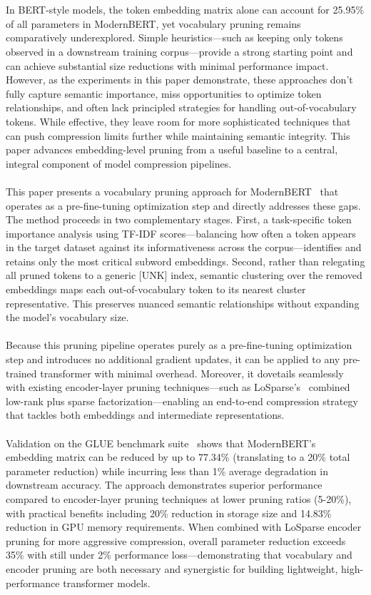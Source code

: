 \documentclass[twocolumn]{article}
\begin{document}
\\ \\
In BERT-style models, the token embedding matrix alone can account for 25.95\% of all parameters in ModernBERT, yet vocabulary pruning remains comparatively underexplored. Simple heuristics—such as keeping only tokens observed in a downstream training corpus—provide a strong starting point and can achieve substantial size reductions with minimal performance impact. However, as the experiments in this paper demonstrate, these approaches don't fully capture semantic importance, miss opportunities to optimize token relationships, and often lack principled strategies for handling out-of-vocabulary tokens. While effective, they leave room for more sophisticated techniques that can push compression limits further while maintaining semantic integrity. This paper advances embedding-level pruning from a useful baseline to a central, integral component of model compression pipelines.
\\ \\
This paper presents a vocabulary pruning approach for ModernBERT~\cite{modernbert2023} that operates as a pre-fine-tuning optimization step and directly addresses these gaps. The method proceeds in two complementary stages. First, a task-specific token importance analysis using TF-IDF scores---balancing how often a token appears in the target dataset against its informativeness across the corpus---identifies and retains only the most critical subword embeddings. Second, rather than relegating all pruned tokens to a generic [UNK] index, semantic clustering over the removed embeddings maps each out-of-vocabulary token to its nearest cluster representative. This preserves nuanced semantic relationships without expanding the model's vocabulary size.
\\ \\
Because this pruning pipeline operates purely as a pre-fine-tuning optimization step and introduces no additional gradient updates, it can be applied to any pre-trained transformer with minimal overhead. Moreover, it dovetails seamlessly with existing encoder-layer pruning techniques---such as LoSparse's~\cite{losparse2023} combined low-rank plus sparse factorization---enabling an end-to-end compression strategy that tackles both embeddings and intermediate representations.
\\ \\
Validation on the GLUE benchmark suite~\cite{wang2018glue} shows that ModernBERT's embedding matrix can be reduced by up to 77.34\% (translating to a 20\% total parameter reduction) while incurring less than 1\% average degradation in downstream accuracy. The approach demonstrates superior performance compared to encoder-layer pruning techniques at lower pruning ratios (5-20\%), with practical benefits including 20\% reduction in storage size and 14.83\% reduction in GPU memory requirements. When combined with LoSparse encoder pruning for more aggressive compression, overall parameter reduction exceeds 35\% with still under 2\% performance loss---demonstrating that vocabulary and encoder pruning are both necessary and synergistic for building lightweight, high-performance transformer models.
\end{document}

